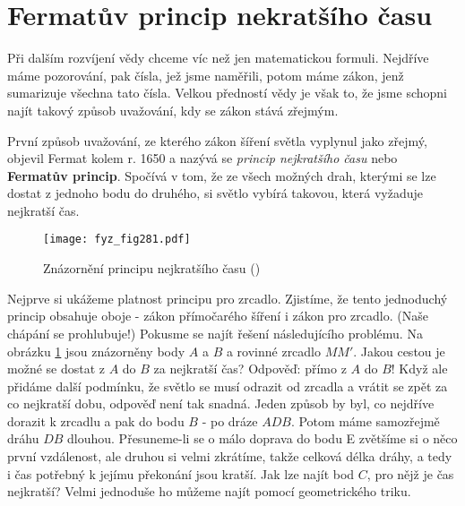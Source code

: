   \section{Fermatův princip nekratšího času}\label{fyz:IchapXXVIsecIII}
    Při dalším rozvíjení vědy chceme víc než jen matematickou formuli. Nejdříve máme pozorování, 
    pak čísla, jež jsme naměřili, potom máme zákon, jenž sumarizuje všechna tato čísla. Velkou 
    předností vědy je však to, že jsme schopni najít takový způsob uvažování, kdy se zákon stává 
    zřejmým. 
    
    První způsob uvažování, ze kterého zákon šíření světla vyplynul jako zřejmý, objevil Fermat 
    kolem r. 1650 a nazývá se \emph{princip nejkratšího času} nebo \textbf{Fermatův princip}. 
    Spočívá v tom, že ze všech možných drah, kterými se lze dostat z jednoho bodu do druhého, si 
    světlo vybírá takovou, která vyžaduje nejkratší čas. 

    \begin{figure}[ht!] %
      \centering
      \texttt{[image: fyz\_fig281.pdf]}
      \caption{Znázornění principu nejkratšího času
               (\cite[s.~348]{Feynman01})}
      \label{fyz:fig281}
    \end{figure}
    
    Nejprve si ukážeme platnost principu pro zrcadlo. Zjistíme, že tento jednoduchý princip 
    obsahuje oboje - zákon přímočarého šíření i zákon pro zrcadlo. (Naše chápání se prohlubuje!) 
    Pokusme se najít řešení následujícího problému. Na obrázku \ref{fyz:fig281} jsou znázorněny 
    body \(A\) a \(B\) a rovinné zrcadlo \(MM'\). Jakou cestou je možné se dostat z \(A\) do \(B\) 
    za nejkratší čas? Odpověď: přímo z \(A\) do \(B\)! Když ale přidáme další podmínku, že světlo 
    se musí odrazit od zrcadla a vrátit se zpět za co nejkratší dobu, odpověď není tak snadná. 
    Jeden způsob by byl, co nejdříve dorazit k zrcadlu a pak do bodu \(B\) - po dráze \(ADB\). 
    Potom máme samozřejmě dráhu \(DB\) dlouhou. Přesuneme-li se o málo doprava do bodu E zvětšíme 
    si o něco první vzdálenost, ale druhou si velmi zkrátíme, takže celková délka dráhy, a tedy i 
    čas potřebný k jejímu překonání jsou kratší. Jak lze najít bod \(C\), pro nějž je čas 
    nejkratší? Velmi jednoduše ho můžeme najít pomocí geometrického triku.
    
